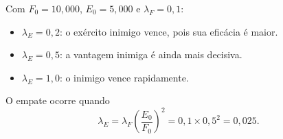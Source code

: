 Com $F_{0}=10{,}000$, $E_{0}=5{,}000$ e $\lambda_{F}=0{,}1$:
\begin{itemize}
\item $\lambda_{E}=0{,}2$: o exército inimigo vence, pois sua eficácia é maior.
\item $\lambda_{E}=0{,}5$: a vantagem inimiga é ainda mais decisiva.
\item $\lambda_{E}=1{,}0$: o inimigo vence rapidamente.
\end{itemize}
O empate ocorre quando
\[
\lambda_{E}=\lambda_{F}\left(\frac{E_{0}}{F_{0}}\right)^{2}=0{,}1\times0{,}5^{2}=0{,}025.
\]